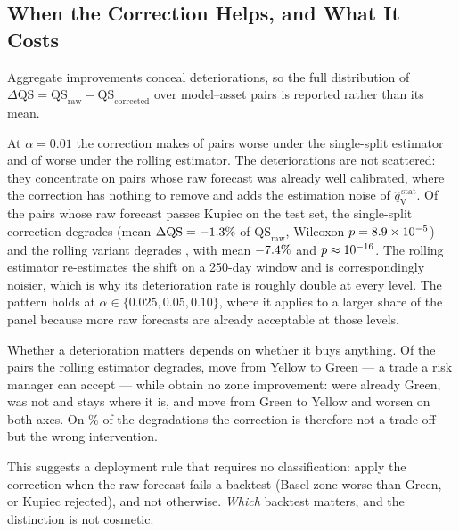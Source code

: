 \documentclass[preprint,11pt,authoryear]{elsarticle}
\newcommand{\1}{\boldsymbol{1}}
\newcommand{\qVstat}{\hat{q}_{\scriptscriptstyle\mathrm{V}}^{\,\mathrm{stat}}}
\begin{document}
\subsection{When the Correction Helps, and What It Costs}
\label{sec:when_to_apply}

Aggregate improvements conceal deteriorations, so the full distribution of
$\Delta\mathrm{QS} = \mathrm{QS}_{\mathrm{raw}} -
\mathrm{QS}_{\mathrm{corrected}}$ over model--asset pairs is reported rather than
its mean.

At $\alpha = 0.01$ the correction makes \nDegradedStatic{} of \nSeqPairs{} pairs
worse under the single-split estimator and \nDegradedRoll{} of \nSeqPairs{} worse
under the rolling estimator. The deteriorations are not scattered: they
concentrate on pairs whose raw forecast was already well calibrated, where the
correction has nothing to remove and adds the estimation noise of $\qVstat$. Of
the \nWellCalStaticN{} pairs whose raw forecast passes Kupiec on the test set,
the single-split correction degrades \nWellCalStaticWorse{} (mean
$\Delta\mathrm{QS} = -1.3\%$ of $\mathrm{QS}_{\mathrm{raw}}$,
Wilcoxon $p = 8.9 \times 10^{-5}$) and the rolling variant degrades
\nWellCalRollWorse, with mean $-7.4\%$ and
$p \approx 10^{-16}$. The rolling estimator re-estimates the shift on a 250-day
window and is correspondingly noisier, which is why its deterioration rate is
roughly double at every level. The pattern holds at
$\alpha \in \{0.025, 0.05, 0.10\}$, where it applies to a larger share of the
panel because more raw forecasts are already acceptable at those levels.

Whether a deterioration matters depends on whether it buys anything. Of the
\nDegradedRoll{} pairs the rolling estimator degrades, \nDegradedRollZoneUp{}
move from Yellow to Green --- a trade a risk manager can accept --- while
\nDegradedRollNoChange{} obtain no zone improvement: \nDegradedRollAlreadyGreen{}
were already Green, \nDegradedRollSameNotGreen{} was not and stays where it is,
and \nDegradedRollZoneDown{} move from Green to Yellow and worsen on both axes. On \nDegradedRollNoChangePct\% of the degradations the correction is
therefore not a trade-off but the wrong intervention.

This suggests a deployment rule that requires no classification: apply the
correction when the raw forecast fails a backtest (Basel zone worse than Green,
or Kupiec rejected), and not otherwise. \emph{Which} backtest matters, and the
distinction is not cosmetic.
\end{document}
